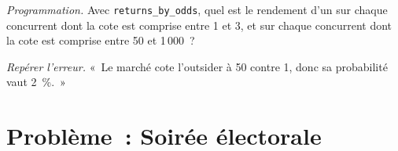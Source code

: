 \begin{exercise}[$\star\star\star$]\label{exo:m3:prediction-and-betting-markets:7}
\emph{Programmation.} Avec \texttt{returns\_by\_odds}, quel est le rendement d'un  sur chaque concurrent dont la cote est comprise entre 1 et 3, et sur chaque concurrent dont la cote est comprise entre
50 et 1\,000~?
\end{exercise}

\begin{exercise}[$\star\star\star$]\label{exo:m3:prediction-and-betting-markets:8}
\emph{Repérer l'erreur.} «~Le marché cote l'outsider à 50 contre 1, donc sa probabilité vaut 2~\%.~»
\end{exercise}

\section{Problème~: Soirée électorale}

